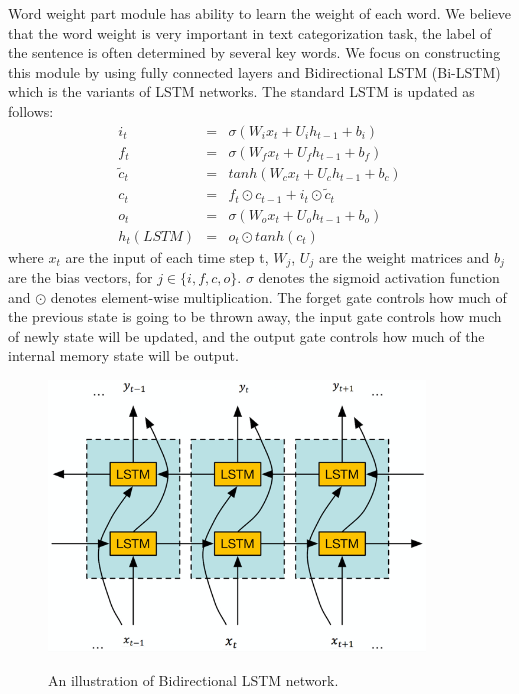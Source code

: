 \documentclass[senior]{IPSstyle}
\begin{document}
Word weight part module has ability to learn the weight of each word. We believe that the word weight is very important in text categorization task, the label of the sentence is often determined by several key words. We focus on constructing this module by using fully connected layers and Bidirectional LSTM (Bi-LSTM)\cite{graves2005framewise} which is the variants of LSTM networks. The standard LSTM is updated as follows:%
\begin{eqnarray}
i_t &=& \sigma(W_ix_t + U_ih_{t-1} + b_i) \\
f_t &=& \sigma(W_fx_t + U_fh_{t-1} + b_f) \\
\tilde{c}_t &=& tanh(W_cx_t + U_ch_{t-1} + b_c) \\
c_t &=& f_t \odot c_{t-1} + i_t \odot \tilde{c}_t \\
o_t &=& \sigma(W_ox_t + U_oh_{t-1} + b_o) \\
h_t(LSTM) &=& o_t \odot tanh(c_t)
\end{eqnarray}
where $x_t$ are the input of each time step t, $W_j$, $U_j$ are the weight matrices and $b_j$ are the bias vectors, for $j\in \{i,f,c,o\}$. $\sigma$ denotes the sigmoid activation function and $\odot$ denotes element-wise multiplication. The forget gate controls how much of the previous state is going to be thrown away, the input gate controls how much of newly state will be updated, and the output gate controls how much of the internal memory state will be output.

\begin{figure}[t]
  \centering
  \includegraphics[width=10cm]{bilstm.jpg}\\
  \caption{An illustration of Bidirectional LSTM network.}\label{NBde}
\end{figure}
\end{document}

